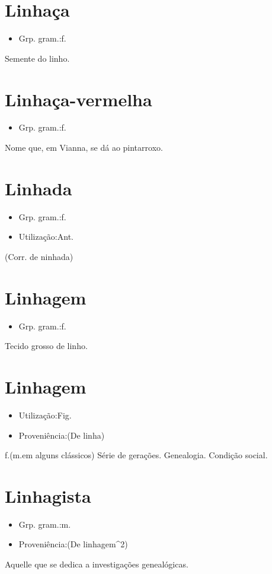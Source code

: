 \section{Linhaça}
\begin{itemize}
\item {Grp. gram.:f.}
\end{itemize}
Semente do linho.
\section{Linhaça-vermelha}
\begin{itemize}
\item {Grp. gram.:f.}
\end{itemize}
Nome que, em Vianna, se dá ao pintarroxo.
\section{Linhada}
\begin{itemize}
\item {Grp. gram.:f.}
\end{itemize}
\begin{itemize}
\item {Utilização:Ant.}
\end{itemize}
(Corr. de \textunderscore ninhada\textunderscore )
\section{Linhagem}
\begin{itemize}
\item {Grp. gram.:f.}
\end{itemize}
Tecido grosso de linho.
\section{Linhagem}
\begin{itemize}
\item {Utilização:Fig.}
\end{itemize}
\begin{itemize}
\item {Proveniência:(De \textunderscore linha\textunderscore )}
\end{itemize}
\textunderscore f.\textunderscore  (\textunderscore m.\textunderscore  em alguns clássicos)
Série de gerações.
Genealogia.
Condição social.
\section{Linhagista}
\begin{itemize}
\item {Grp. gram.:m.}
\end{itemize}
\begin{itemize}
\item {Proveniência:(De \textunderscore linhagem\textunderscore ^2)}
\end{itemize}
Aquelle que se dedica a investigações genealógicas.
